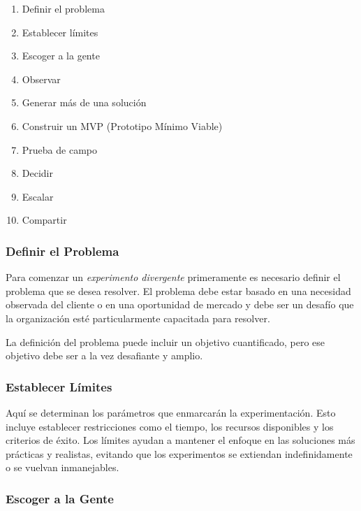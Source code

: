 \begin{enumerate}
	\item Definir el problema

	\item Establecer límites

	\item Escoger a la gente

	\item Observar

	\item Generar más de una solución

	\item Construir un MVP (Prototipo Mínimo Viable)

	\item Prueba de campo

	\item Decidir

	\item Escalar

	\item Compartir
\end{enumerate}

\subsubsection{Definir el Problema}

Para comenzar un \emph{experimento divergente} primeramente es necesario definir
el problema que se desea resolver. El problema debe estar basado en una necesidad
observada del cliente o en una oportunidad de mercado y debe ser un desafío que la
organización esté particularmente capacitada para resolver.

La definición del problema puede incluir un objetivo cuantificado, pero ese
objetivo debe ser a la vez desafiante y amplio.

\subsubsection{Establecer Límites}

Aquí se determinan los parámetros que enmarcarán la experimentación. Esto
incluye establecer restricciones como el tiempo, los recursos disponibles y los criterios
de éxito. Los límites ayudan a mantener el enfoque en las soluciones más
prácticas y realistas, evitando que los experimentos se extiendan indefinidamente
o se vuelvan inmanejables.

\subsubsection{Escoger a la Gente}

